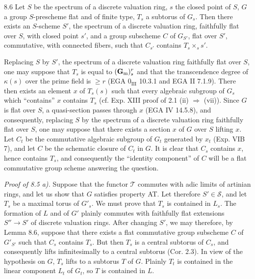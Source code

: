 \begin{lemma}{8.6}\label{XV.8.6}
Let $S$ be the spectrum of a discrete valuation ring, $s$ the closed point of $S$, $G$ a group $S$-prescheme flat and of finite type, $T_s$ a subtorus of $G_s$. Then there exists an $S$-scheme $S'$, the spectrum of a discrete valuation ring, faithfully flat over $S$, with closed point $s'$, and a group subscheme $C$ of $G_{S'}$, flat over $S'$, commutative, with connected fibers, such that $C_{s'}$ contains $T_s\times_s s'$.
\end{lemma}
Replacing $S$ by $S'$, the spectrum of a discrete valuation ring faithfully flat over $S$, one may suppose that $T_s$ is equal to $(\mathbf{G}_{\mathrm{m}})^r_s$ and that the transcendence degree of $\kappa(s)$ over the prime field is $\geq r$ (EGA $0_{\mathrm{III}}$ 10.3.1 and EGA II 7.1.9). There then exists an element $x$ of $T_s(s)$ such that every algebraic subgroup of $G_s$ which ``contains'' $x$ contains $T_s$ (cf. Exp. XIII proof of 2.1 (ii) $\Rightarrow$ (vii)). Since $G$ is flat over $S$, a quasi-section passes through $x$ (EGA IV 14.5.8), and consequently, replacing $S$ by the spectrum of a discrete valuation ring faithfully flat over $S$, one may suppose that there exists a section $x$ of $G$ over $S$ lifting $x$. Let $C_t$ be the commutative algebraic subgroup of $G_t$ generated by $x_t$ (Exp. VIB 7), and let $C$ be the schematic closure of $C_t$ in $G$. It is clear that $C_s$ contains $x$, hence contains $T_s$, and consequently the ``identity component'' of $C$ will be a flat commutative group scheme answering the question.

\par\noindent\emph{Proof of 8.5 a).}
Suppose that the functor $\mathscr T$ commutes with adic limits of artinian rings, and let us show that $G$ satisfies property AT. Let therefore $S'\in\mathscr S$, and let $T_s$ be a maximal torus of $G'_s$. We must prove that $T_s$ is contained in $L_s$. The formation of $L$ and of $G'$ plainly commutes with faithfully flat extensions $S''\to S'$ of discrete valuation rings. After changing $S'$, we may therefore, by Lemma 8.6, suppose that there exists a flat commutative group subscheme $C$ of $G'_{S'}$ such that $C_s$ contains $T_s$. But then $T_s$ is a central subtorus of $C_s$, and consequently lifts infinitesimally to a central subtorus (Cor. 2.3). In view of the hypothesis on $G$, $T_s$ lifts to a subtorus $T$ of $G$. Plainly $T_t$ is contained in the linear component $L_t$ of $G_t$, so $T$ is contained in $L$.

